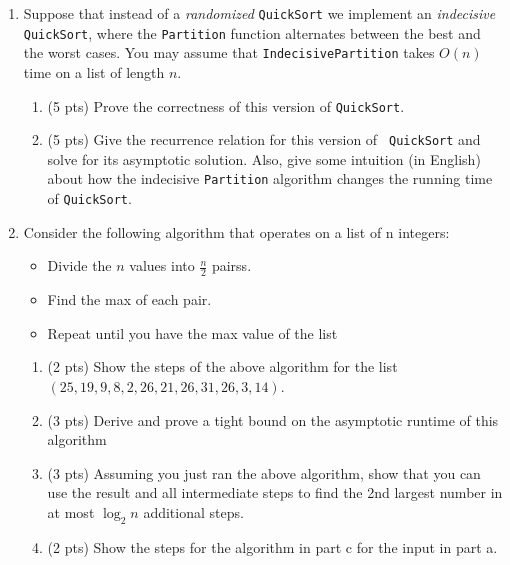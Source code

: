 \documentclass[12pt]{article}
\begin{document}
\renewcommand{\headrulewidth}{0.5pt}
\phantom{Test}


\vspace{-3mm}

\begin{enumerate}

\item Suppose that instead of a {\sl randomized} {\tt QuickSort} we implement
an {\sl indecisive} {\tt QuickSort}, where the {\tt Partition} function
alternates between the best and the worst cases. You may assume that {\tt IndecisivePartition} takes $O(n)$ time on a list of length $n$.

\begin{enumerate}
    \item (5 pts) Prove the correctness of this version of {\tt QuickSort}.
    \pagebreak	
    \item (5 pts) Give the recurrence relation for this version of {\tt
    QuickSort} and solve for its asymptotic solution. Also, give some intuition
    (in English) about how the indecisive {\tt Partition} algorithm changes the
    running time of {\tt QuickSort}.
    \pagebreak	
\end{enumerate}
	

\item Consider the following algorithm that operates on a list of n integers:
\begin{itemize}
    \item Divide the $n$ values into $\frac{n}{2}$ pairss.
    \item Find the max of each pair.
    \item Repeat until you have the max value of the list
\end{itemize}

\begin{enumerate}
    \item (2 pts) Show the steps of the above algorithm for the list $(25, 19, 9, 8, 2, 26, 21, 26, 31, 26, 3, 14)$.
    \pagebreak	
    \item (3 pts) Derive and prove a tight bound on the asymptotic runtime of this algorithm
    \pagebreak	
    \item (3 pts) Assuming you just ran the above algorithm, show that you can
    use the result and all intermediate steps to find the 2nd largest number in
    at most $\log_{2}n$ additional steps.
    \pagebreak	
    \item (2 pts) Show the steps for the algorithm in part c for the input in
    part a.
    \pagebreak	
\end{enumerate}


\end{enumerate}
\end{document}
